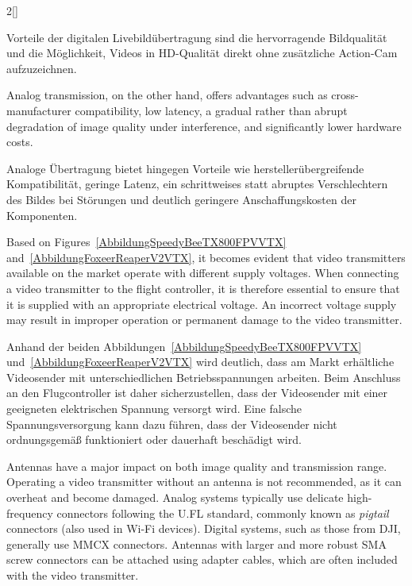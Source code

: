 \begin{paracol}{2}[]
\colger

Vorteile der digitalen Livebildübertragung sind die hervorragende Bildqualität und die Möglichkeit, Videos in HD-Qualität direkt ohne zusätzliche Action-Cam aufzuzeichnen.

\coleng

Analog transmission, on the other hand, offers advantages such as cross-manufacturer compatibility, low latency, a gradual rather than abrupt degradation of image quality under interference, and significantly lower hardware costs.

\colger

Analoge Übertragung bietet hingegen Vorteile wie herstellerübergreifende Kompatibilität, geringe Latenz, ein schrittweises statt abruptes Verschlechtern des Bildes bei Störungen und deutlich geringere Anschaffungskosten der Komponenten.

\coleng

Based on Figures~\ref{AbbildungSpeedyBeeTX800FPVVTX} and~\ref{AbbildungFoxeerReaperV2VTX}, it becomes evident that video transmitters available on the market operate with different supply voltages. When connecting a video transmitter to the flight controller, it is therefore essential to ensure that it is supplied with an appropriate electrical voltage. An incorrect voltage supply may result in improper operation or permanent damage to the video transmitter.

\colger

Anhand der beiden Abbildungen~\ref{AbbildungSpeedyBeeTX800FPVVTX} und~\ref{AbbildungFoxeerReaperV2VTX} wird deutlich, dass am Markt erhältliche Videosender mit unterschiedlichen Betriebsspannungen arbeiten. Beim Anschluss an den Flugcontroller ist daher sicherzustellen, dass der Videosender mit einer geeigneten elektrischen Spannung versorgt wird. Eine falsche Spannungsversorgung kann dazu führen, dass der Videosender nicht ordnungsgemäß funktioniert oder dauerhaft beschädigt wird.

\coleng

Antennas have a major impact on both image quality and transmission range. Operating a video transmitter without an antenna is not recommended, as it can overheat and become damaged. Analog systems typically use delicate high-frequency connectors following the U.FL standard, commonly known as \textsl{pigtail} connectors (also used in Wi-Fi devices). Digital systems, such as those from DJI, generally use MMCX connectors. Antennas with larger and more robust SMA screw connectors can be attached using adapter cables, which are often included with the video transmitter.


\end{paracol}
